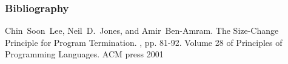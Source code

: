 


\begin{frame}
  \frametitle<presentation>{Bibliography}

  \begin{thebibliography}{10}
  \beamertemplatearticlebibitems
    Chin~Soon~Lee, Neil~D.~Jones, and Amir~Ben-Amram.
    \newblock The Size-Change Principle for Program Termination.
    , pp. 81-92. Volume 28 of Principles of Programming Languages. ACM press 2001
  \end{thebibliography}
\end{frame}


